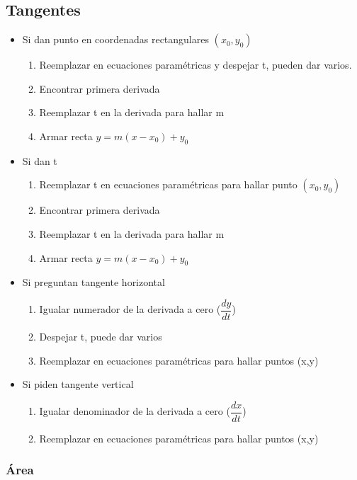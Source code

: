 \subsection{Tangentes}

\begin{itemize}
	\item Si dan punto en coordenadas rectangulares $(x_0,y_0)$
	\begin{enumerate}
		\item Reemplazar en ecuaciones paramétricas y despejar t, pueden dar varios.
		\item Encontrar primera derivada
		\item Reemplazar t en la derivada para hallar m
		\item Armar recta $y=m(x-x_0)+y_0$
	\end{enumerate}
	\item Si dan t
	\begin{enumerate}
		\item Reemplazar t en ecuaciones paramétricas para hallar punto $(x_0,y_0)$
		\item Encontrar primera derivada
		\item Reemplazar t en la derivada para hallar m
		\item Armar recta $y=m(x-x_0)+y_0$
	\end{enumerate}
	\item Si preguntan tangente horizontal
	\begin{enumerate}
		\item Igualar numerador de la derivada a cero ($\dfrac{dy}{dt}$)
		\item Despejar t, puede dar varios
		\item Reemplazar en ecuaciones paramétricas para hallar puntos (x,y)
	\end{enumerate}
	\item Si piden tangente vertical
	\begin{enumerate}
		\item Igualar denominador de la derivada a cero ($\dfrac{dx}{dt}$)
		\item Reemplazar en ecuaciones paramétricas para hallar puntos (x,y)
	\end{enumerate}
\end{itemize}

\subsubsection{Área}

